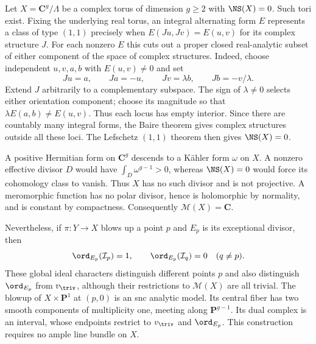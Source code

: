 \begin{example}\label{ex:mp-nonprojective-torus}
Let $X=\mathbf C^g/\Lambda$ be a complex torus of dimension
$g\geq2$ with $\NS(X)=0$. Such tori exist. Fixing the underlying
real torus, an integral alternating form $E$ represents a
class of type $(1,1)$ precisely when
$E(Ju,Jv)=E(u,v)$ for its complex structure $J$.
For each nonzero $E$ this cuts out a proper closed real-analytic
subset of either component of the space of complex structures.
Indeed, choose independent $u,v,a,b$ with $E(u,v)\ne0$ and set
\[
 Ju=a,\qquad Ja=-u,\qquad
 Jv=\lambda b,\qquad Jb=-v/\lambda.
\]
Extend $J$ arbitrarily to a complementary subspace. The sign
of $\lambda\ne0$ selects either orientation component; choose
its magnitude so that $\lambda E(a,b)\ne E(u,v)$. Thus each
locus has empty interior. Since there are countably many
integral forms, the Baire theorem gives complex structures
outside all these loci. The Lefschetz $(1,1)$ theorem then
gives $\NS(X)=0$.

A positive Hermitian form on $\mathbf C^g$ descends to a
K\"ahler form $\omega$ on $X$. A nonzero effective divisor
$D$ would have
$\int_D\omega^{g-1}>0$, whereas $\NS(X)=0$ would force
its cohomology class to vanish. Thus $X$ has no such divisor
and is not projective. A meromorphic function has no polar
divisor, hence is holomorphic by normality, and is constant
by compactness. Consequently $\mathcal M(X)=\mathbf C$.

Nevertheless, if $\pi:Y\to X$ blows up a point $p$ and $E_p$
is its exceptional divisor, then
\[
 \ord_{E_p}(\mathcal I_p)=1,\qquad
 \ord_{E_p}(\mathcal I_q)=0\quad(q\ne p).
\]
These global ideal characters distinguish different points
$p$ and also distinguish $\ord_{E_p}$ from $v_{\triv}$,
although their restrictions to $\mathcal M(X)$ are all trivial.
The blowup of $X\times\mathbf P^1$ at $(p,0)$ is an snc
analytic model. Its central fiber has two smooth components
of multiplicity one, meeting along $\mathbf P^{g-1}$.
Its dual complex is an interval, whose endpoints restrict
to $v_{\triv}$ and $\ord_{E_p}$. This construction requires
no ample line bundle on $X$.
\end{example}

